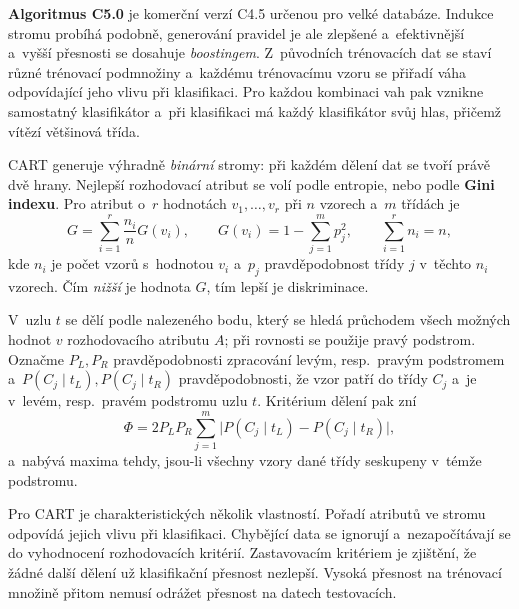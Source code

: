\documentclass[11pt,a4paper]{article}
\theoremstyle{definition}
\begin{document}
\textbf{Algoritmus C5.0} je komerční verzí C4.5 určenou pro velké databáze. Indukce stromu
probíhá podobně, generování pravidel je ale zlepšené a~efektivnější a~vyšší přesnosti se
dosahuje \emph{boostingem}. Z~původních trénovacích dat se staví různé trénovací podmnožiny
a~každému trénovacímu vzoru se přiřadí váha odpovídající jeho vlivu při klasifikaci. Pro
každou kombinaci vah pak vznikne samostatný klasifikátor a~při klasifikaci má každý
klasifikátor svůj hlas, přičemž vítězí většinová třída.

\begin{defbox}
CART generuje výhradně \emph{binární} stromy: při každém dělení dat se tvoří právě dvě hrany.
Nejlepší rozhodovací atribut se volí podle entropie, nebo podle \textbf{Gini indexu}. Pro
atribut o~$r$ hodnotách $v_1,\dots,v_r$ při $n$ vzorech a~$m$ třídách je
\[ G=\sum_{i=1}^{r}\frac{n_i}{n}G(v_i),\qquad G(v_i)=1-\sum_{j=1}^{m}p_j^2,
   \qquad \sum_{i=1}^{r}n_i=n, \]
kde $n_i$ je počet vzorů s~hodnotou $v_i$ a~$p_j$ pravděpodobnost třídy $j$ v~těchto $n_i$
vzorech. Čím \emph{nižší} je hodnota $G$, tím lepší je diskriminace.

V~uzlu $t$ se dělí podle  nalezeného bodu, který se hledá průchodem všech
možných hodnot $v$ rozhodovacího atributu $A$; při rovnosti se použije pravý podstrom.
Označme $P_L,P_R$ pravděpodobnosti zpracování levým, resp.\ pravým podstromem
a~$P(C_j\mid t_L),P(C_j\mid t_R)$ pravděpodobnosti, že vzor patří do třídy $C_j$ a~je v~levém,
resp.\ pravém podstromu uzlu $t$. Kritérium dělení pak zní
\[ \Phi=2P_LP_R\sum_{j=1}^{m}\big|P(C_j\mid t_L)-P(C_j\mid t_R)\big|, \]
a~nabývá maxima tehdy, jsou-li všechny vzory dané třídy seskupeny v~témže podstromu.

Pro CART je charakteristických několik vlastností. Pořadí atributů ve stromu odpovídá jejich
vlivu při klasifikaci. Chybějící data se ignorují a~nezapočítávají se do vyhodnocení
rozhodovacích kritérií. Zastavovacím kritériem je zjištění, že žádné další dělení už
klasifikační přesnost nezlepší. Vysoká přesnost na trénovací množině přitom nemusí odrážet
přesnost na datech testovacích.
\end{defbox}
\end{document}

